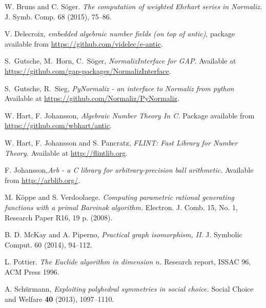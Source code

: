 \documentclass[12pt,a4paper]{scrartcl}
\theoremstyle{definition}
\begin{document}
\begin{thebibliography}{15.}
 W. Bruns and C. S\"oger. {\em The computation of weighted Ehrhart series in Normaliz.} J. Symb. Comp. 68 (2015), 75--86.

 V. Delecroix, {\em embedded algebraic number fields (on top of antic)}, package available from \url{https://github.com/videlec/e-antic}.

 S.~Gutsche, M.~Horn, C.~S\"oger,
\emph{NormalizInterface for GAP}. 
Available at \url{https://github.com/gap-packages/NormalizInterface}.

 S.~Gutsche, R.~Sieg,
\emph{PyNormaliz - an interface to Normaliz from python}
Available at \url{https://github.com/Normaliz/PyNormaliz}.

 W. Hart, F. Johansson, {\em Algebraic Number Theory In C.} Package available from \url{https://github.com/wbhart/antic}.

 W. Hart, F. Johansson and S. Pancratz, \emph{FLINT: Fast Library for Number Theory.} Available at \url{ http://flintlib.org}.

 F. Johansson,{\em Arb - a C library for arbitrary-precision ball arithmetic.} Available from \url{http://arblib.org/}.

 M. K\"oppe and S. Verdoolaege. {\em  Computing
parametric rational generating functions with a primal
Barvinok algorithm.} Electron. J. Comb.
15, No. 1, Research Paper R16, 19 p. (2008).

B. D. McKay and A. Piperno,
\emph{Practical graph isomorphism, II}.
J. Symbolic Comput. { 60} (2014), 94--112.

 L. Pottier. {\em The Euclide algorithm in dimension
$n$}. Research report, ISSAC 96, ACM Press 1996.

 A. Sch\"{u}rmann, {\em Exploiting
	polyhedral symmetries in social choice.}
Social Choice and Welfare \textbf{40} (2013), 1097--1110.
\end{thebibliography}
\end{document}
